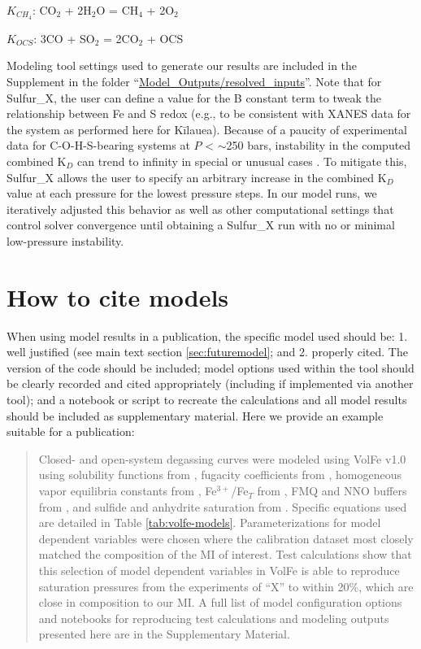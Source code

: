 \documentclass[draft, english]{volcanica-template}
\begin{document}
$K_{CH_4}$: CO$_2$ + 2H$_2$O = CH$_4$ + 2O$_2$

$K_{OCS}$: 3CO + SO$_2$ = 2CO$_2$ + OCS

\noindent Modeling tool settings used to generate our results are included in the Supplement in the folder ``\url{Model\_Outputs/resolved\_inputs}''. Note that for Sulfur\_X, the user can define a value for the B constant term to tweak the relationship between Fe and S redox (e.g., to be consistent with XANES data for the system as performed here for Kīlauea). Because of a paucity of experimental data for C-O-H-S-bearing systems at $P$ < $\sim$250 bars, instability in the computed combined K$_D$ can trend to infinity in special or unusual cases \parencite{Ding2023}. To mitigate this, Sulfur\_X allows the user to specify an arbitrary increase in the combined K$_D$ value at each pressure for the lowest pressure steps. In our model runs, we iteratively adjusted this behavior as well as other computational settings that control solver convergence until obtaining a Sulfur\_X run with no or minimal low-pressure instability. 

\label{supp-table_comparison-table}

\section{How to cite models}
When using model results in a publication, the specific model used should be: 1. well justified (see main text section \ref{sec:futuremodel}; and 2. properly cited. The version of the code should be included; model options used within the tool should be clearly recorded and cited appropriately (including if implemented via another tool); and a notebook or script to recreate the calculations and all model results should be included as supplementary material. Here we provide an example suitable for a publication:

\begin{quote}
    Closed- and open-system degassing curves were modeled using VolFe v1.0 \parencite{Hughes2025volfe} using solubility functions from \textcite{hughes2024modeling, dixon1995,ONeill2021, Oneill2022, ardia2013}, fugacity coefficients from \textcite{shi1992,shaw1964,holland1991, Hughes2023, hughes2024}, homogeneous vapor equilibria constants from \textcite{ohmoto1977, moussallam2019}, Fe$^{3+}$/Fe$_T$ from \textcite{Kress1991}, FMQ and NNO buffers from \textcite{Frost1991}, and sulfide and anhydrite saturation from \textcite{ONeill2021, chowdhury2019effect,  wieser2023pysulfsat}. Specific equations used are detailed in Table \ref{tab:volfe-models}.  Parameterizations for model dependent variables were chosen where the calibration dataset most closely matched the composition of the MI of interest. Test calculations show that this selection of model dependent variables in VolFe is able to reproduce saturation pressures from the experiments of ``X'' to within 20\%, which are close in composition to our MI. A full list of model configuration options and notebooks for reproducing test calculations and modeling outputs presented here are in the Supplementary Material.
\end{quote}
\end{document}
